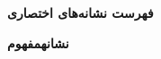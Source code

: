 \centerline{\textbf{فهرست نشانه‌های اختصاری}}

\vspace{\baselineskip}
\textbf{نشانه}\hfill\textbf{مفهوم}

\vspace{0.5\baselineskip}
